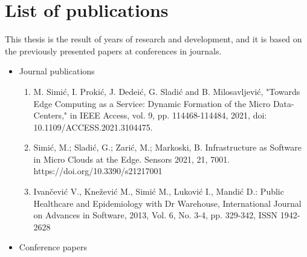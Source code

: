 \chapter*{List of publications}
%
This thesis is the result of years of research and development, and it is based on the previously presented papers at conferences in journals.

\begin{itemize}
	
	\item Journal publications
	
	\begin{enumerate}[start=1,label={(\bfseries \arabic*)}]
		\item M. Simić, I. Prokić, J. Dedeić, G. Sladić and B. Milosavljević, "Towards Edge Computing as a Service: Dynamic Formation of the Micro Data-Centers," in IEEE Access, vol. 9, pp. 114468-114484, 2021, doi: 10.1109/ACCESS.2021.3104475.
		\item Simić, M.; Sladić, G.; Zarić, M.; Markoski, B. Infrastructure as Software in Micro Clouds at the Edge. Sensors 2021, 21, 7001. https://doi.org/10.3390/s21217001
		\item  Ivančević V., Knežević M., Simić M., Luković I., Mandić D.:  Public Healthcare and Epidemiology with Dr Warehouse, International Journal on Advances in Software, 2013, Vol. 6, No. 3-4, pp. 329-342, ISSN 1942-2628
	\end{enumerate}
	
	\item Conference papers
	

\end{itemize}
